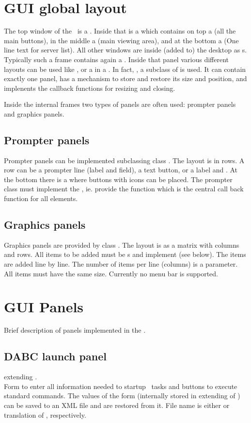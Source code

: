 \section{GUI global layout}
The top window of the \gui~is a . Inside that is a 
which contains on top a  (all the main buttons), 
in the middle a  (main viewing area), and at the bottom
a  (One line text for server list). 
All other windows are inside (added to) the desktop as s.
Typically such a frame contains again a . Inside that panel various
different layouts can be used like , or a  in a .
In fact, , a subclass of  is used.
It can contain exactly one panel, has a mechanism to store and restore its size and position,
and implenents the callback functions for resizing and closing.

Inside the internal frames two types of panels are often used: prompter panels and
graphics panels.
\subsection{Prompter panels}
Prompter panels can be implemented subclassing class .
The layout is in rows. A row can be a prompter line (label and  field),
a text button, or a label and . At the bottom there is a 
where buttons with icons can be placed. The prompter class must implement the 
, ie. provide the  function which is
the central call back function for all elements.
\subsection{Graphics panels}
Graphics panels are provided by class .
The layout is as a matrix with columns and rows. All items to be added 
must be s and implement  (see below).
The items are added line by line. The number of items per line (columns)
is a parameter. All items must have the same size.
Currently no menu bar is supported.
\section{GUI Panels}
Brief description of panels implemented in the \gui.
\subsection{DABC launch panel}
 extending .\\
Form to enter all information needed to startup \dabc~tasks and
buttons to execute standard commands.
The values of the form (internally stored in  extending of )
can be saved to an XML file and are restored from it. File name is either
 or translation of , respectively.
